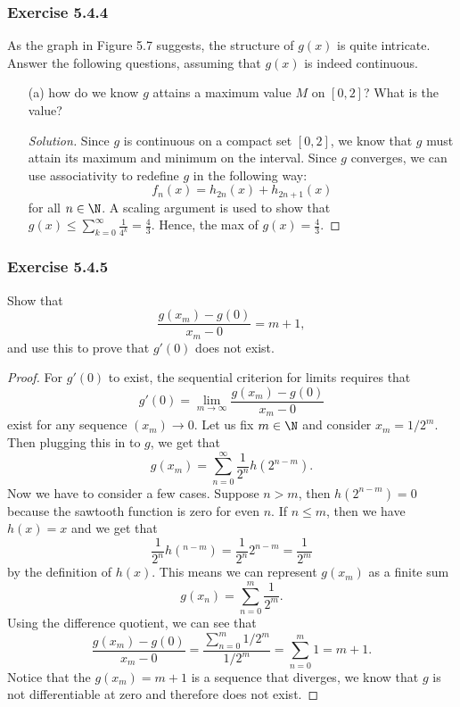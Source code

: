  \subsubsection{Exercise 5.4.4} As the graph in Figure 5.7 suggests, the structure of \( g(x)  \) is quite intricate. Answer the following questions, assuming that \( g(x) \) is indeed continuous. \begin{enumerate}
    \item[(a)] how do we know \( g  \) attains a maximum value \( M  \) on \( [0,2]  \)?  What is the value? 
        \begin{proof}[Solution]
        Since \(  g \) is continuous on a compact set \( [0,2]  \), we know that \( g  \) must attain its maximum and minimum on the interval. Since \( g  \) converges, we can use associativity to redefine \( g \) in the following way:
        \[  f_n (x) = h_{2n}(x) + h_{2n+1}(x)  \] for all \(  n \in \N  \). A scaling argument is used to show that \( g(x) \leq \sum_{ k=0 }^{ \infty  } \frac{ 1 }{ 4^k } = \frac{ 4 }{ 3 }. \) Hence, the max of \( g(x)  = \frac{ 4 }{ 3 }. \) 
        \end{proof}
\end{enumerate}

\subsubsection{Exercise 5.4.5} Show that 
\[  \frac{ g(x_m) - g(0)  }{ x_m - 0  } = m+1,  \]
and use this to prove that \( g'(0)  \) does not exist.
\begin{proof}
For \( g'(0)  \) to exist, the sequential criterion for limits requires that 
\[ g'(0) = \lim_{ m \to \infty  }  \frac{ g(x_m) - g(0)  }{ x_m - 0  }  \] exist for any sequence \( (x_m) \to 0  \). Let us fix \( m \in \N  \) and consider \( x_m  = 1 / 2^m \). Then plugging this in to \( g  \), we get that
\[ g(x_m) = \sum_{ n=0 }^{ \infty  } \frac{ 1 }{ 2^n  } h(2^{n-m}).\] Now we have to consider a few cases. Suppose \( n > m  \), then \( h(2^{n-m})  = 0  \) because the sawtooth function is zero for even \( n  \). If \(  n \leq m  \), then we have \( h(x) = x  \) and we get that 
\[  \frac{ 1 }{ 2^n } h(^{n-m} ) = \frac{ 1 }{ 2^n } 2^{n-m} = \frac{ 1 }{ 2^m } \]
by the definition of \( h(x)  \). This means we can represent \( g(x_m)  \) as a finite sum
\[  g(x_n) = \sum_{ n=0 }^{ m } \frac{ 1 }{ 2^m }. \] Using the difference quotient, we can see that 
\[  \frac{ g(x_m) - g(0)  }{ x_m - 0  } = \frac{ \sum_{ n=0 }^{ m } 1/2^m }{ 1/2^m } = \sum_{ n=0 }^{ m }1 = m + 1. \]
Notice that the \( g(x_m) = m + 1  \) is a sequence that diverges, we know that \( g  \) is not differentiable at zero and therefore does not exist.
\end{proof}

